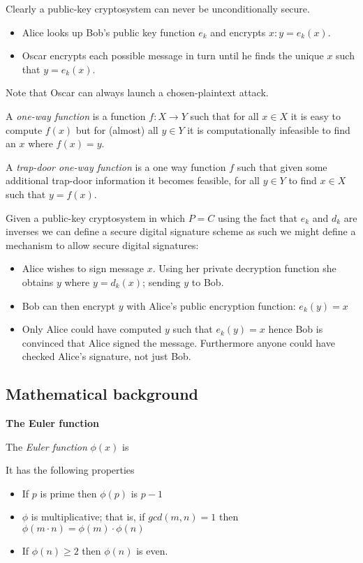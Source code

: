 Clearly a public-key cryptosystem can never be unconditionally secure.
\begin{itemize}
    \item Alice looks up Bob’s public key function $e_k$ and encrypts $x : y = e_k(x)$.
    \item Oscar encrypts each possible message in turn until he finds the unique $x$ such that $y = e_k(x)$.
\end{itemize}
Note that Oscar can always launch a chosen-plaintext attack.

\begin{definition}
    A \textit{one-way function} is a function $f : X \rightarrow Y$ such that 
    for all $x \in X$ it is easy to compute $f(x)$ but for (almost) all $y \in Y$ it is computationally
    infeasible to find an $x$ where $f(x) = y$.
\end{definition}
\begin{definition}
    A \textit{trap-door one-way function} is a one way function $f$ such that
    given some additional trap-door information it becomes feasible, 
    for all $y \in Y$ to find $x \in X$ such that $y = f(x)$.
\end{definition}

Given a public-key cryptosystem in which $P = C$
using the fact that $e_k$ and $d_k$ are inverses
we can define a secure digital signature scheme as such
we might define a mechanism to allow secure digital signatures:
\begin{itemize}
    \item
        Alice wishes to sign message $x$.
        Using her private decryption function she obtains $y$ where $y = d_k(x)$;
        sending $y$ to Bob.
    \item Bob can then encrypt $y$ with Alice’s public encryption function: $e_k(y) = x$
    \item Only Alice could have computed $y$ such that $e_k(y) = x$ hence Bob is convinced that
    Alice signed the message.
    Furthermore anyone could have checked Alice’s signature, not just Bob.
\end{itemize}

\subsection{Mathematical background}
\textbf{The Euler function}\\
\begin{definition}
    The \textit{Euler function} $\phi(x)$ is
\end{definition}
It has the following properties
\begin{itemize}
    \item If $p$ is prime then $\phi(p)$ is $p - 1$
    \item $\phi$ is multiplicative; that is,
        if $gcd(m,n) = 1$ then $\phi(m \cdot n) = \phi(m) \cdot \phi(n)$
    \item If $\phi(n) \geq 2$ then $\phi(n)$ is even.
\end{itemize}

